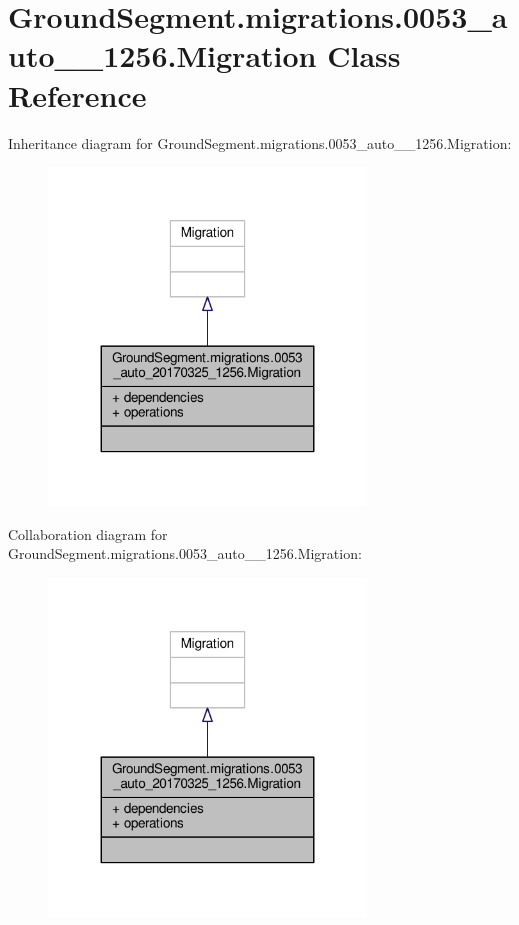 \hypertarget{class_ground_segment_1_1migrations_1_10053__auto__20170325__1256_1_1_migration}{}\section{Ground\+Segment.\+migrations.0053\+\_\+auto\+\_\+\_\+1256.Migration Class Reference}
\label{class_ground_segment_1_1migrations_1_10053__auto__20170325__1256_1_1_migration}


Inheritance diagram for Ground\+Segment.\+migrations.0053\+\_\+auto\+\_\+\_\+1256.Migration\+:\nopagebreak
\begin{figure}[H]
\begin{center}
\leavevmode
\includegraphics[width=239pt]{class_ground_segment_1_1migrations_1_10053__auto__20170325__1256_1_1_migration__inherit__graph}
\end{center}
\end{figure}


Collaboration diagram for Ground\+Segment.\+migrations.0053\+\_\+auto\+\_\+\_\+1256.Migration\+:\nopagebreak
\begin{figure}[H]
\begin{center}
\leavevmode
\includegraphics[width=239pt]{class_ground_segment_1_1migrations_1_10053__auto__20170325__1256_1_1_migration__coll__graph}
\end{center}
\end{figure}
